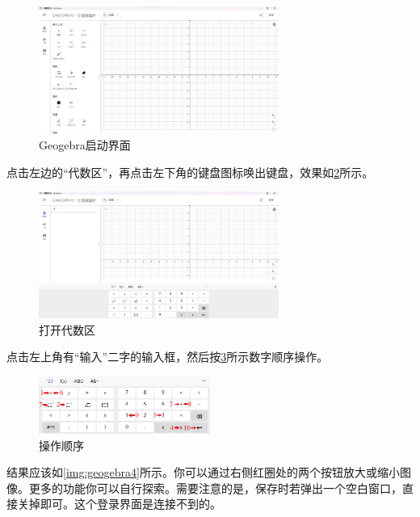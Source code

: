 \documentclass[lang=cn,math=cm,chinesefont=nofont,11pt,scheme=chinese,twocol]{elegantbook}
\begin{document}
\begin{figure}[h]
  \centering
  \includegraphics[width=0.7\textwidth]{image/geogebra1.png}
  \caption{Geogebra启动界面}
  \label{img:geogebra1}
\end{figure}



\hspace*{\fill}

点击左边的“代数区”，再点击左下角的键盘图标唤出键盘，效果如\ref{img:geogebra2}所示。

\begin{figure}[h]
  \centering
  \includegraphics[width=0.7\textwidth]{image/geogebra2.png}
  \caption{打开代数区}
  \label{img:geogebra2}
\end{figure}

点击左上角有“输入”二字的输入框，然后按\ref{img:geogebra3}所示数字顺序操作。

\begin{figure}[h]
  \centering
  \includegraphics[width=0.5\textwidth]{image/geogebra3.png}
  \caption{操作顺序}
  \label{img:geogebra3}
\end{figure}

结果应该如\ref{img:geogebra4}所示。你可以通过右侧红圈处的两个按钮放大或缩小图像。更多的功能你可以自行探索。需要注意的是，保存时若弹出一个空白窗口，直接关掉即可。这个登录界面是连接不到的。
\end{document}
